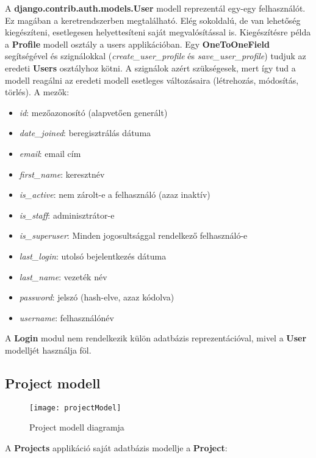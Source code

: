 A \textbf{django.contrib.auth.models.User} modell reprezentál egy-egy felhasználót. Ez magában a keretrendszerben megtalálható. Elég sokoldalú, de van lehetőség kiegészíteni, esetlegesen helyettesíteni saját megvalósítással is. Kiegészítésre példa a \textbf{Profile} modell osztály a users applikációban. Egy \textbf{OneToOneField} segítségével és szignálokkal (\textit{create\_user\_profile} és \textit{save\_user\_profile}) tudjuk az eredeti \textbf{Users} osztályhoz kötni. A szignálok azért szükségesek, mert így tud a modell reagálni az eredeti modell esetleges változásaira (létrehozás, módosítás, törlés). A mezők:

\begin{itemize}
	\item \textit{id}: mezőazonosító (alapvetően generált)
	\item \textit{date\_joined}: beregisztrálás dátuma
	\item \textit{email}: email cím
	\item \textit{first\_name}: keresztnév
	\item \textit{is\_active}: nem zárolt-e a felhasználó (azaz inaktív)
	\item \textit{is\_staff}: adminisztrátor-e
	\item \textit{is\_superuser}: Minden jogosultsággal rendelkező felhasználó-e
	\item \textit{last\_login}: utolsó bejelentkezés dátuma
	\item \textit{last\_name}: vezeték név
	\item \textit{password}: jelszó (hash-elve, azaz kódolva)
	\item \textit{username}: felhasználónév
\end{itemize}

A \textbf{Login} modul nem rendelkezik külön adatbázis reprezentációval, mivel a \textbf{User} modelljét használja föl.

\subsection{Project modell}

\begin{figure}[H]
	\centering
	\texttt{[image: projectModel]}
	\caption{Project modell diagramja}
	\label{fig:projectmodel}
\end{figure}

A \textbf{Projects} applikáció saját adatbázis modellje a \textbf{Project}:

